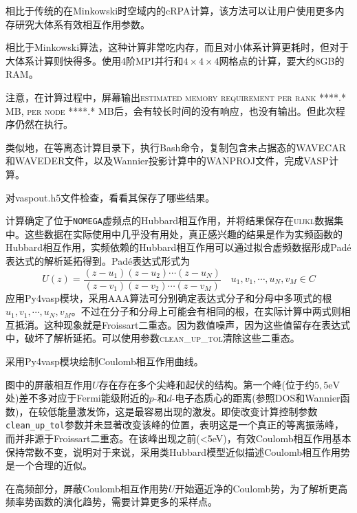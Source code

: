 相比于传统的在\textrm{Minkowski}时空域内的\textrm{cRPA}计算，该方法可以让用户使用更多内存研究大体系有效相互作用参数。

相比于\textrm{Minkowski}算法，这种计算非常吃内存，而且对小体系计算更耗时，但对于大体系计算则快得多。使用4阶\textrm{MPI}并行和$4\times4\times4$网格点的计算，要大约\textrm{8GB}的\textrm{RAM}。

注意，在计算过程中，屏幕输出\textsc{estimated memory requirement per rank ****.* MB, per node ****.* MB}后，会有较长时间的没有响应，也没有输出。但此次程序仍然在执行。

类似地，在等离态计算目录下，执行\textrm{Bash}命令，复制包含未占据态的\textrm{WAVECAR}和\textrm{WAVEDER}文件，以及\textrm{Wannier}投影计算中的\textrm{WANPROJ}文件，完成\textrm{VASP}计算。

对\textrm{vaspout.h5}文件检查，看看其保存了哪些结果。

计算确定了位于\texttt{NOMEGA}虚频点的\textrm{Hubbard}相互作用，并将结果保存在\textsc{uijkl}数据集中。这些数据在实际使用中几乎没有用处，真正感兴趣的结果是作为实频函数的\textrm{Hubbard}相互作用，实频依赖的\textrm{Hubbard}相互作用可以通过拟合虚频数据形成\textrm{Pad\'e}表达式的解析延拓得到。\textrm{Pad\'e}表达式形式为
\begin{displaymath}
	U(z)=\dfrac{(z-u_1)(z-u_2)\cdots(z-u_N)}{(z-v_1)(z-v_2)\cdots(z-v_M)} \quad u_1,v_1,\cdots,u_N,v_M\in C
\end{displaymath}
应用\textrm{Py4vasp}模块，采用\textrm{AAA}算法可分别确定表达式分子和分母中多项式的根$u_1,v_1,\cdots,u_N,v_M$。不过在分子和分母上可能会有相同的根，在实际计算中两式则相互抵消。这种现象就是\textrm{Froissart}二重态。因为数值噪声，因为这些值留存在表达式中，破坏了解析延拓。可以使用参数\textsc{clean\_up\_tol}清除这些二重态。

采用\textrm{Py4vasp}模块绘制\textrm{Coulomb}相互作用曲线。

图中的屏蔽相互作用$U$存在存在多个尖峰和起伏的结构。第一个峰(位于约$\mathrm{5,5eV}$处)差不多对应于\textrm{Fermi}能级附近的$p$-和$d$-电子态质心的距离(参照\textrm{DOS}和\textrm{Wannier}函数)，在较低能量激发饰，这是最容易出现的激发。即使改变计算控制参数\texttt{clean\_up\_tol}参数并未显著改变该峰的位置，表明这是一个真正的等离振荡峰，而并非源于\textrm{Froissart}二重态。在该峰出现之前\textrm{(<\textrm{5eV})}，有效\textrm{Coulomb}相互作用基本保持常数不变，说明对于来说，采用类\textrm{Hubbard}模型近似描述\textrm{Coulomb}相互作用势是一个合理的近似。

在高频部分，屏蔽\textrm{Coulomb}相互作用势$U$开始逼近净的\textrm{Coulomb}势，为了解析更高频率势函数的演化趋势，需要计算更多的采样点。


